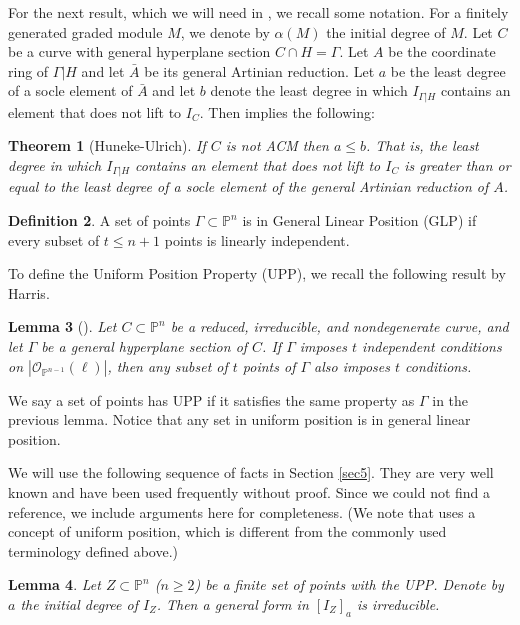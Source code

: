 \documentclass[12pt]{amsart}%
\numberwithin{equation}{section}
\newtheorem{theorem}{Theorem}[section]
\newtheorem{lemma}[theorem]{Lemma}
\theoremstyle{definition}
\newtheorem{definition}[theorem]{Definition}
\numberwithin{equation}{section}
\newcommand{\PP}{ \ensuremath{\mathbb{P}}}
\begin{document}
For the next result, which we will need in , we recall some notation. For a  finitely generated graded module $M$, we denote by $\alpha(M)$ the initial degree of $M$. Let $C$ be a curve with general hyperplane section $C \cap H = \Gamma$. Let $A$ be the coordinate ring of $\Gamma | H$ and let $\bar A$ be its general Artinian reduction. Let $a$ be the least degree of a socle element of $\bar A$ and let $b$ denote the least degree in which $I_{\Gamma|H}$ contains an element that does not lift to $I_C$.
Then \cite[Theorem 3.16]{HU} implies the following:  

\begin{theorem}[Huneke-Ulrich] \label{HU fact}
If $C$ is not ACM then $a \leq b$. That is, the least degree in which $I_{\Gamma|H}$  contains an element that does not lift to $I_C$ is greater than or equal to the least degree of a socle element of the general Artinian reduction of $A$.  
\end{theorem}

\begin{definition}
    A set of points $\Gamma\subset \PP^n$ is in General Linear Position (GLP) if every subset of $t\leq n+1$ points is linearly independent.
\end{definition}
To define the Uniform Position Property (UPP), we recall the following result by Harris.

\begin{lemma}[{\cite[Uniform Position Lemma]{harris}}]Let $C\subset \PP^n$ be a reduced, irreducible, and nondegenerate curve, and let $\Gamma$ be a general hyperplane section of $C$. If $\Gamma$ imposes $t$ independent conditions on $|\mathcal O_{\PP^{n-1}}(\ell)|$, then any subset of $t$ points of $\Gamma$ also imposes $t$ conditions. \end{lemma}

 We say a set of points has UPP if it satisfies the same property as $\Gamma$ in the previous lemma. 
Notice that any set in uniform position is in general linear position. 


We will use the following sequence of facts in Section \ref{sec5}. They are very well known and have been used frequently without proof. Since we could not find a reference, we include arguments here for completeness.  (We note that \cite[Theorem 3.4]{GerMar} uses a concept of uniform position, which is different from the commonly used terminology defined above.)

\begin{lemma}
    \label{lem:irredinit}
Let $Z \subset \mathbb P^n$ ($n \ge 2$) be a finite set of points with the UPP. Denote by $a$ the initial degree of $I_Z$. Then a general form in $[I_Z]_a$ is irreducible.
\end{lemma}
\end{document}
